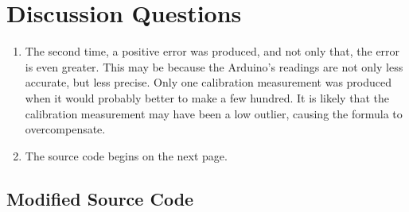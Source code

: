 \documentclass[12pt]{article}
\begin{document}
\section*{Discussion Questions}

\begin{enumerate}
    \item The second time, a positive error was produced, and not only that, the error is even greater. 
    This may be because the Arduino's readings are not only less accurate, but less precise. Only one 
    calibration measurement was produced when it would probably better to make a few hundred. It is likely 
    that the calibration measurement may have been a low outlier, causing the formula to overcompensate.

    \item The source code begins on the next page.
\end{enumerate}

\pagebreak

\subsection*{Modified Source Code}
\end{document}
